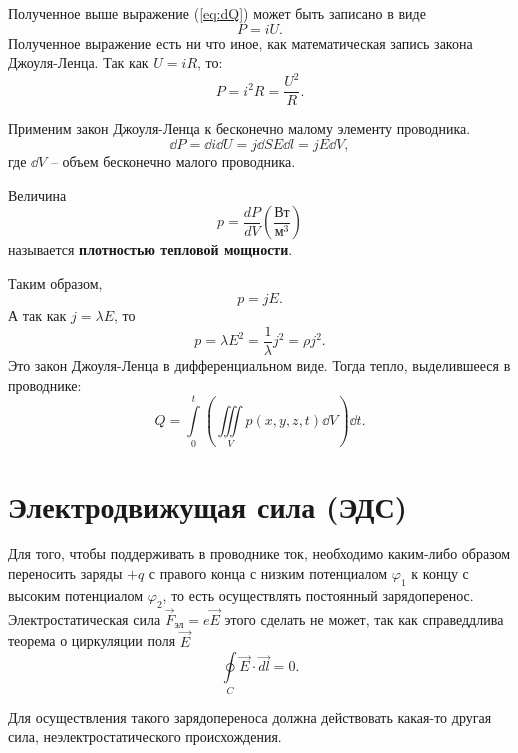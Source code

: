     Полученное выше выражение (\ref{eq:dQ}) может быть записано в виде
    \begin{equation}
        P = iU.
    \end{equation}
    Полученное выражение есть ни что иное, как математическая запись закона
    Джоуля-Ленца. Так как \( U = iR \), то:
    \[
        P = i^2 R = \frac{U^2}{R}.
    \]
    
    Применим закон Джоуля-Ленца к бесконечно малому элементу проводника.
    \[
        \dd P = \dd i\dd U = j\dd SE\dd l = jE\dd V,
    \]
    где \( \dd V \) -- объем бесконечно малого проводника.
    
    \begin{definition}
        Величина
        \[
            p = \frac{dP}{dV} \left(\frac{\text{Вт}}{\text{м}^3}\right)
        \]
        называется \textbf{плотностью тепловой мощности}.
    \end{definition}
    
    Таким образом,
    \begin{equation}
        p = jE.
    \end{equation}
    А так как \( j = \lambda E \), то
    \[
        p = \lambda E^2 = \frac{1}{\lambda}j^2 = \rho j^2.
    \]
    Это закон Джоуля-Ленца в дифференциальном виде. Тогда тепло, выделившееся
    в проводнике:
    \[
        Q = \int\limits_0^t \left(
            \iiint\limits_V p(x, y, z, t)\dd V
            \right) \dd t.
    \]
    
\section{Электродвижущая сила (ЭДС)}
    
    Для того, чтобы поддерживать в проводнике ток, необходимо каким-либо образом
    переносить заряды \( +q \) с правого конца с низким потенциалом
    \( \varphi_1 \) к концу с высоким потенциалом \( \varphi_2 \), то есть
    осуществлять постоянный зарядоперенос. Электростатическая сила
    \( \vec{F}_{\textit{эл}} = e\vec{E} \) этого сделать не может, так как
    справеддлива теорема о циркуляции поля \( \vec{E} \)
    \[
        \oint\limits_C \vec{E}\cdot\vec{dl} = 0.
    \]
    
    Для осуществления такого зарядопереноса должна действовать какая-то другая
    сила, неэлектростатического происхождения.
    
